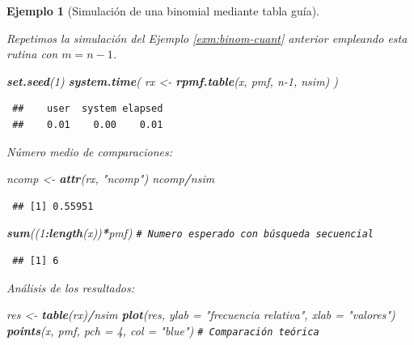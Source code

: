 \documentclass[
  spanish,
  10pt,
]{book}
\newenvironment{Shaded}{\begin{snugshade}}{\end{snugshade}}
\newcommand{\AttributeTok}[1]{\textcolor[rgb]{0.13,0.29,0.53}{#1}}
\newcommand{\CommentTok}[1]{\textcolor[rgb]{0.56,0.35,0.01}{\textit{#1}}}
\newcommand{\DecValTok}[1]{\textcolor[rgb]{0.00,0.00,0.81}{#1}}
\newcommand{\FunctionTok}[1]{\textcolor[rgb]{0.13,0.29,0.53}{\textbf{#1}}}
\newcommand{\NormalTok}[1]{#1}
\newcommand{\OtherTok}[1]{\textcolor[rgb]{0.56,0.35,0.01}{#1}}
\newcommand{\SpecialCharTok}[1]{\textcolor[rgb]{0.81,0.36,0.00}{\textbf{#1}}}
\newcommand{\StringTok}[1]{\textcolor[rgb]{0.31,0.60,0.02}{#1}}
\theoremstyle{break}
\newtheorem{example}{Ejemplo}[chapter]
\theoremstyle{nonumberplain}
\renewcommand{\CommentTok}[1]{\textcolor[rgb]{0.41,0.41,0.41}{\texttt{#1}}}
\begin{document}
\begin{example}[Simulación de una binomial mediante tabla guía]
\protect\hypertarget{exm:binom-tabla}{}\label{exm:binom-tabla}

Repetimos la simulación del Ejemplo \ref{exm:binom-cuant} anterior empleando esta rutina con \(m=n-1\).

\begin{Shaded}
\begin{Highlighting}[]
\FunctionTok{set.seed}\NormalTok{(}\DecValTok{1}\NormalTok{)}
\FunctionTok{system.time}\NormalTok{( rx }\OtherTok{\textless{}{-}} \FunctionTok{rpmf.table}\NormalTok{(x, pmf, n}\DecValTok{{-}1}\NormalTok{, nsim) )}
\end{Highlighting}
\end{Shaded}

\begin{verbatim}
 ##    user  system elapsed 
 ##    0.01    0.00    0.01
\end{verbatim}

Número medio de comparaciones:

\begin{Shaded}
\begin{Highlighting}[]
\NormalTok{ncomp }\OtherTok{\textless{}{-}} \FunctionTok{attr}\NormalTok{(rx, }\StringTok{"ncomp"}\NormalTok{)}
\NormalTok{ncomp}\SpecialCharTok{/}\NormalTok{nsim}
\end{Highlighting}
\end{Shaded}

\begin{verbatim}
 ## [1] 0.55951
\end{verbatim}

\begin{Shaded}
\begin{Highlighting}[]
\FunctionTok{sum}\NormalTok{((}\DecValTok{1}\SpecialCharTok{:}\FunctionTok{length}\NormalTok{(x))}\SpecialCharTok{*}\NormalTok{pmf) }\CommentTok{\# Numero esperado con búsqueda secuencial}
\end{Highlighting}
\end{Shaded}

\begin{verbatim}
 ## [1] 6
\end{verbatim}

Análisis de los resultados:

\begin{Shaded}
\begin{Highlighting}[]
\NormalTok{res }\OtherTok{\textless{}{-}} \FunctionTok{table}\NormalTok{(rx)}\SpecialCharTok{/}\NormalTok{nsim}
\FunctionTok{plot}\NormalTok{(res, }\AttributeTok{ylab =} \StringTok{"frecuencia relativa"}\NormalTok{, }\AttributeTok{xlab =} \StringTok{"valores"}\NormalTok{)}
\FunctionTok{points}\NormalTok{(x, pmf, }\AttributeTok{pch =} \DecValTok{4}\NormalTok{, }\AttributeTok{col =} \StringTok{"blue"}\NormalTok{)  }\CommentTok{\# Comparación teórica}
\end{Highlighting}
\end{Shaded}


\end{example}
\end{document}
